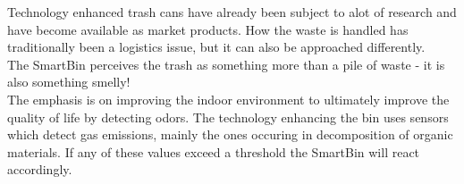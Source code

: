 Technology enhanced trash cans have already been subject to alot of research and have become available as market products.
How the waste is handled has traditionally been a logistics issue, but it can also be approached differently.\\
The SmartBin perceives the trash as something more than a pile of waste - it is also something smelly!\\
The emphasis is on improving the indoor environment to ultimately improve the quality of life by detecting odors.
The technology enhancing the bin uses sensors which detect gas emissions, mainly the ones occuring in decomposition of organic materials.
If any of these values exceed a threshold the SmartBin will react accordingly.
